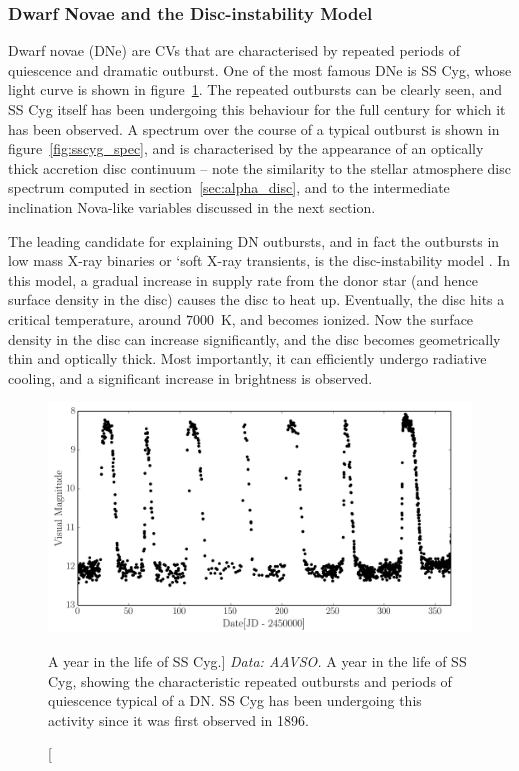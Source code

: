 \subsubsection{Dwarf Novae and the Disc-instability Model}

Dwarf novae (DNe) are CVs that are characterised 
by repeated periods of quiescence and dramatic outburst. One of the 
most famous DNe is SS Cyg, whose light curve is shown in 
figure~\ref{fig:sscyg}. The repeated outbursts can be clearly seen, and
SS Cyg itself has been undergoing this behaviour for the full century 
for which it has been observed. A spectrum over the course of a 
typical outburst is shown in figure~\ref{fig:sscyg_spec}, 
and is characterised by the appearance of an optically thick
accretion disc continuum -- note the similarity to the 
stellar atmosphere disc spectrum computed in section~\ref{sec:alpha_disc},
and to the intermediate inclination Nova-like variables discussed in the next
section.

The leading candidate for explaining DN outbursts, and in fact the outbursts
in low mass X-ray binaries or `soft X-ray transients,
is the disc-instability model 
\citep[DIM; ][]{osaki1974,lasota2001}. 
In this model, a gradual increase in supply rate from the donor star 
(and hence surface density in the disc) 
causes the disc to heat up. Eventually, the disc hits a critical temperature,
around $7000$~K, and becomes ionized. Now the surface density in the disc
can increase significantly, and the disc becomes geometrically thin and
optically thick. Most importantly, it can efficiently undergo radiative
cooling, and a significant increase in brightness is observed.

\begin{figure}
\centering
\includegraphics[width=1.0\textwidth]{figures/01-intro/lc_sscyg.png}
\caption
[A year in the life of SS Cyg.]
{
{\sl Data: AAVSO.} 
A year in the life of SS Cyg, showing the characteristic repeated
outbursts and periods of quiescence typical of a DN. SS Cyg has been
undergoing this activity since it was first observed in 1896.
} 
\label{fig:sscyg}
\end{figure}

